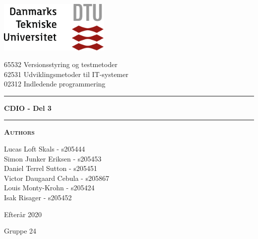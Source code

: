 
\begin{titlepage}
\begin{center}
\vspace{2cm}
\includegraphics[width=0.4\textwidth]{root/dtu.png}~\\[1cm]
\vspace{0.2cm}

65532 Versionsstyring og testmetoder \\
62531 Udviklingsmetoder til IT-systemer \\
02312 Indledende programmering \\

\vspace{1cm}

\hrule
\vspace{.5cm}
{ \huge \bfseries  CDIO - Del 3} %
\vspace{.5cm}

\hrule
\vspace{1.5cm}

\textsc{\textbf{Authors}}\\
\vspace{.5cm}


Lucas Loft Skals - s205444\\
Simon Junker Eriksen - s205453\\
Daniel Terrel Sutton - s205451\\
Victor Daugaard Cebula - s205867\\
Louis Monty-Krohn - s205424\\
Isak Risager - s205452\\

\vspace{2cm}

Efterår 2020

\vspace{0.5cm}

Gruppe 24

\end{center}
\end{titlepage}